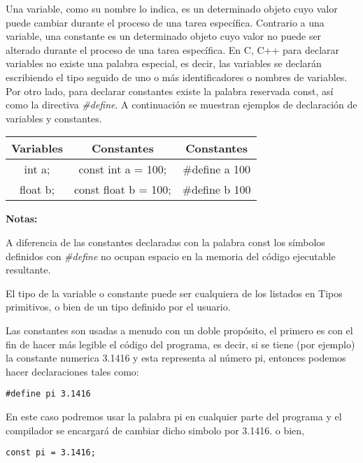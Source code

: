 Una variable, como su nombre lo indica, es un determinado objeto cuyo valor puede cambiar durante el proceso de una tarea específica. Contrario a una variable, una constante es un determinado objeto cuyo valor no puede ser alterado durante el proceso de una tarea específica. En C, C++ para declarar variables no existe una palabra especial, es decir, las variables se declarán escribiendo el tipo seguido de uno o más identificadores o nombres de variables. Por otro lado, para declarar constantes existe la palabra reservada const, así como la directiva \textit{\#define}. A continuación se muestran ejemplos de declaración de variables y constantes.
\begin{center}
	\begin{tabular}{|c|c|c|}
		\hline
		Variables & Constantes & Constantes\\
		\hline
		int a; & const int a = 100;	&  \#define a 100\\
		\hline
		float b; & const float b = 100; & \#define b 100\\
		\hline
	\end{tabular}
\end{center}

\textbf{Notas:}

A diferencia de las constantes declaradas con la palabra const los símbolos definidos con \textit{\#define} no ocupan espacio en la memoria del código ejecutable resultante.

El tipo de la variable o constante puede ser cualquiera de los listados en Tipos primitivos, o bien de un tipo definido por el usuario.

Las constantes son usadas a menudo con un doble propósito, el primero es con el fin de hacer más legible el código del programa, es decir, si se tiene (por ejemplo) la constante numerica 3.1416 y esta representa al número pi, entonces podemos hacer declaraciones tales como:

\begin{lstlisting}[style=Cpp, label=constantes, caption=Constantes]
#define pi 3.1416
\end{lstlisting}

En este caso podremos usar la palabra pi en cualquier parte del
programa y el compilador se encargará de cambiar dicho simbolo por 3.1416.
o bien,

\begin{lstlisting}[style=Cpp, label=constantes, caption=Constantes]
const pi = 3.1416;
\end{lstlisting}


